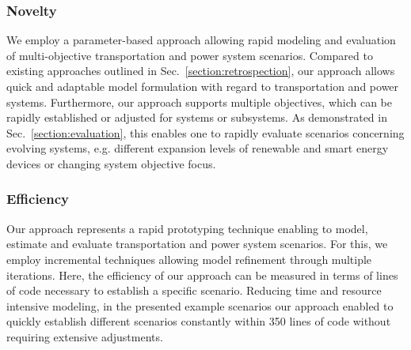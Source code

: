 
\subsubsection*{Novelty}

We employ a parameter-based approach allowing rapid modeling and evaluation of multi-objective transportation and power system scenarios. Compared to existing approaches outlined in Sec.~\ref{section:retrospection}, our approach allows quick and adaptable model formulation with regard to transportation and power systems. Furthermore, our approach supports multiple objectives, which can be rapidly established or adjusted for systems or subsystems.
As demonstrated in Sec.~\ref{section:evaluation}, this enables one to rapidly evaluate scenarios concerning evolving systems, e.g. different expansion levels of renewable and smart energy devices or changing system objective focus.

\subsubsection*{Efficiency}

Our approach represents a rapid prototyping technique enabling to model, estimate and evaluate transportation and power system scenarios. For this, we employ incremental techniques allowing model refinement through multiple iterations. Here, the efficiency of our approach can be measured in terms of lines of code necessary to establish a specific scenario. Reducing time and resource intensive modeling, in the presented example scenarios our approach enabled to quickly establish different scenarios constantly within 350 lines of code without requiring extensive adjustments. 

